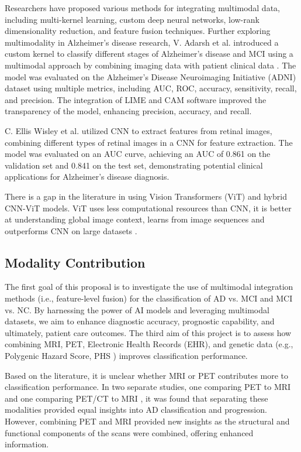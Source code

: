 Researchers have proposed various methods for integrating multimodal data, including multi-kernel learning, custom deep neural networks, low-rank dimensionality reduction, and feature fusion techniques. Further exploring multimodality in Alzheimer's disease research, V. Adarsh et al. introduced a custom kernel to classify different stages of Alzheimer’s disease and MCI using a multimodal approach by combining imaging data with patient clinical data \cite{adarsh_multimodal_2024}. The model was evaluated on the Alzheimer’s Disease Neuroimaging Initiative (ADNI) dataset using multiple metrics, including AUC, ROC, accuracy, sensitivity, recall, and precision. The integration of LIME and CAM software improved the transparency of the model, enhancing precision, accuracy, and recall.

C. Ellis Wisley et al. \cite{wisely_convolutional_2022}utilized CNN to extract features from retinal images, combining different types of retinal images in a CNN for feature extraction. The model was evaluated on an AUC curve, achieving an AUC of 0.861 on the validation set and 0.841 on the test set, demonstrating potential clinical applications for Alzheimer's disease diagnosis. 

There is a gap in the literature in using Vision Transformers (ViT) and hybrid CNN-ViT models. ViT uses less computational resources than CNN, it is better at understanding global image context, learns from image sequences and outperforms CNN on large datasets \cite{dosovitskiy_image_2021}. 
\subsection{Modality Contribution}
The first goal of this proposal is to investigate the use of multimodal integration methods (i.e., feature-level fusion) for the classification of AD vs. MCI and MCI vs. NC. By harnessing the power of AI models and leveraging multimodal datasets, we aim to enhance diagnostic accuracy, prognostic capability, and ultimately, patient care outcomes. The third aim of this project is to assess how combining MRI, PET, Electronic Health Records (EHR), and genetic data (e.g., Polygenic Hazard Score, PHS \cite{desikan_genetic_2017}) improves classification performance.

Based on the literature, it is unclear whether MRI or PET contributes more to classification performance. In two separate studies, one comparing PET to MRI \cite{wisely_convolutional_2022} and one comparing PET/CT to MRI \cite{zhang_petmr_2017}, it was found that separating these modalities provided equal insights into AD classification and progression. However, combining PET and MRI provided new insights as the structural and functional components of the scans were combined, offering enhanced information. 

